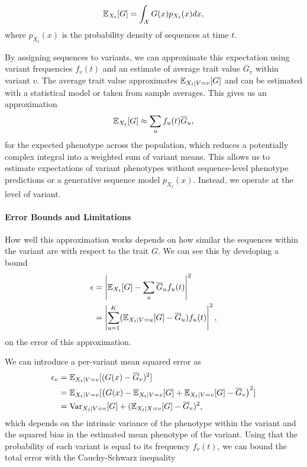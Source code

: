 \begin{equation}
  \mathbb{E}_{X_t}[G] = \int_{\mathcal{X}} G(x) p_{X_{t}}(x) dx,
\end{equation}
where $p_{X_t}(x)$ is the probability density of sequences at time $t$.

By assigning sequences to variants, we can approximate this expectation using variant frequencies $f_{v}(t)$ and an estimate of average trait value $\overline{G}_{v}$ within variant $v$.
The average trait value approximates $\mathbb{E}_{X_t \mid V=v}[G]$ and can be estimated with a statistical model or taken from sample averages.
This gives us an approximation
\begin{equation}
  \mathbb{E}_{X_t}[G] \approx \sum_{u} f_{u}(t) \overline{G}_u,
\end{equation}
for the expected phenotype across the population, which reduces a potentially complex integral into a weighted sum of variant means.
This allows us to estimate expectations of variant phenotypes without sequence-level phenotype predictions or a generative sequence model $p_{X_t}(x)$.
Instead, we operate at the level of variant.


\paragraph{Error Bounds and Limitations}

How well this approximation works depends on how similar the sequences within the variant are with respect to the trait $G$. 
We can see this by developing a bound 
\begin{align}
  \epsilon &= \left| \mathbb{E}_{X_t}[G]  - \sum_{u} \overline{G}_u f_{u}(t) \right|^2\\ 
           &= \left| \sum_{u=1}^{K} (\mathbb{E}_{X_{t} \mid V=u}[G] - \overline{G}_u) f_u(t) \right|^2,
\end{align}
on the error of this approximation.

We can introduce a per-variant mean squared error as 
\begin{align}
  \epsilon_v &= \mathbb{E}_{X_{t} \mid V=v}[(G(x) - \overline{G}_v)^2]\\
           &= \mathbb{E}_{X_{t} \mid V=v}[\left(G(x) - \mathbb{E}_{X_{t} \mid V=v}[G] + \mathbb{E}_{X_{t} \mid V=v}[G] - \overline{G}_v\right)^2 ]\\
           &= \text{Var}_{X_{t} \mid V=v}[G] + (\mathbb{E}_{X_t \mid X=v}[G] - \overline{G}_v)^2,
\end{align}
which depends on the intrinsic variance of the phenotype within the variant and the squared bias in the estimated mean phenotype of the variant.
Using that the probability of each variant is equal to its frequency $f_v(t)$, we can bound the total error with the Cauchy-Schwarz inequality

